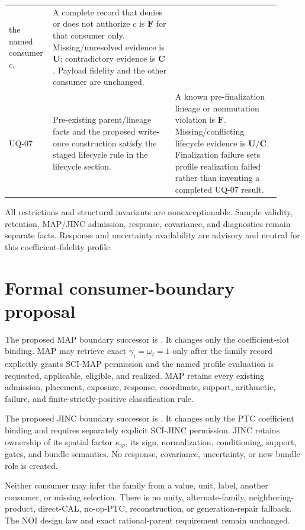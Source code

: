 \begin{longtable}{p{0.11\linewidth}p{0.43\linewidth}p{0.37\linewidth}}
the named consumer \(c\). & A complete record that denies or does not authorize
\(c\) is \(\mathbf F\) for that consumer only. Missing/unresolved evidence is
\(\mathbf U\); contradictory evidence is \(\mathbf C\). Payload fidelity and
the other consumer are unchanged.\\
UQ-07 & Pre-existing parent/lineage facts and the proposed write-once
construction satisfy the staged lifecycle rule in the lifecycle section. &
A known pre-finalization lineage or nonmutation violation is \(\mathbf F\).
Missing/conflicting lifecycle evidence is \(\mathbf U/\mathbf C\).
Finalization failure sets profile realization failed rather than inventing a
completed UQ-07 result.\\
\bottomrule
\end{longtable}

All restrictions and structural invariants are nonexceptionable. Sample
validity, retention, MAP/JINC admission, response, covariance, and diagnostics
remain separate facts. Response and uncertainty availability are advisory and
neutral for this coefficient-fidelity profile.

\section{Formal consumer-boundary proposal}

The proposed MAP boundary successor is \MapBoundaryDraft. It changes only the
coefficient-slot binding. MAP may retrieve exact \(\gamma_i=\omega_i=1\) only
after the family record explicitly grants SCI-MAP permission and the named
profile evaluation is requested, applicable, eligible, and realized. MAP
retains every existing admission, placement, exposure, response, coordinate,
support, arithmetic, failure, and finite-strictly-positive classification
rule.

The proposed JINC boundary successor is \JincBoundaryDraft. It changes only
the PTC coefficient binding and requires separately explicit SCI-JINC
permission. JINC retains ownership of its spatial factor \(\kappa_{ip}\), its
sign, normalization, conditioning, support, gates, and bundle semantics. No
response, covariance, uncertainty, or new bundle role is created.

Neither consumer may infer the family from a value, unit, label, another
consumer, or missing selection. There is no unity, alternate-family,
neighboring-product, direct-CAL, no-op-PTC, reconstruction, or
generation-repair fallback. The NOI design law and exact rational-parent
requirement remain unchanged.

\fi

